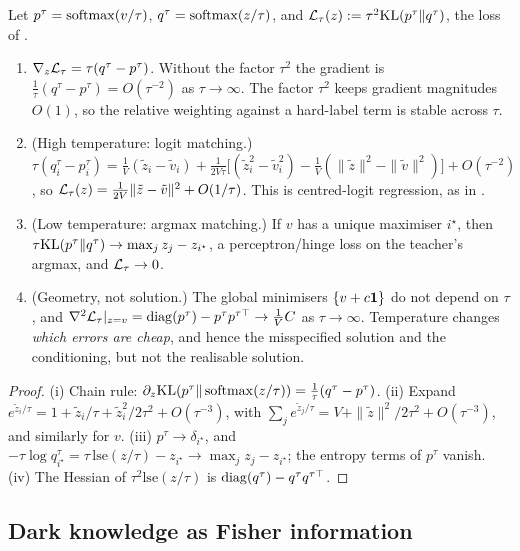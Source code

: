 Let $p^\tau=\operatorname{softmax}(v/\tau)$, $q^\tau=\operatorname{softmax}(z/\tau)$, and $\mathcal{L}_\tau(z):=\tau^2\mathrm{KL}(p^\tau\|q^\tau)$, the loss of
\citet{hinton2015distilling}.
\begin{proposition}\label{prop:temperature}
\Pv\Ck
\begin{enumerate}[label=(\roman*),nosep]
\item $\nabla_z\mathcal{L}_\tau=\tau(q^\tau-p^\tau)$. Without the factor $\tau^2$ the gradient is $\frac1\tau(q^\tau-p^\tau)=O(\tau^{-2})$
as $\tau\to\infty$. The factor $\tau^2$ keeps gradient magnitudes $O(1)$, so the relative weighting against a
hard-label term is stable across $\tau$.
\item (High temperature: logit matching.)
$\tau(q^\tau_i-p^\tau_i)=\frac1V(\tilde z_i-\tilde v_i)+\frac1{2V\tau}\big[(\tilde z_i^2-\tilde v_i^2)-\frac1V(\|\tilde z\|^2-\|\tilde v\|^2)\big]+O(\tau^{-2})$,
so $\mathcal{L}_\tau(z)=\frac1{2V}\|\tilde z-\tilde v\|^2+O(1/\tau)$. This is centred-logit regression, as in
\citet{ba2014do}.
\item (Low temperature: argmax matching.) If $v$ has a unique maximiser $i^\star$, then
$\tau\mathrm{KL}(p^\tau\|q^\tau)\to\max_jz_j-z_{i^\star}$, a perceptron/hinge loss on the teacher's argmax, and $\mathcal{L}_\tau\to0$.
\item (Geometry, not solution.) The global minimisers $\{v+c\mathbf{1}\}$ do not depend on $\tau$, and
$\nabla^2\mathcal{L}_\tau|_{z=v}=\operatorname{diag}(p^\tau)-p^\tau p^{\tau\top}\to\frac1VC$ as $\tau\to\infty$. Temperature changes \emph{which
errors are cheap}, and hence the misspecified solution and the conditioning, but not the realisable
solution.
\end{enumerate}
\end{proposition}
\begin{proof}
(i) Chain rule: $\partial_z\mathrm{KL}(p^\tau\|\operatorname{softmax}(z/\tau))=\frac1\tau(q^\tau-p^\tau)$.
(ii) Expand $e^{\tilde z_i/\tau}=1+\tilde z_i/\tau+\tilde z_i^2/2\tau^2+O(\tau^{-3})$, with
$\sum_je^{\tilde z_j/\tau}=V+\|\tilde z\|^2/2\tau^2+O(\tau^{-3})$, and similarly for $v$.
(iii) $p^\tau\to\delta_{i^\star}$, and $-\tau\log q^\tau_{i^\star}=\tau\,\mathrm{lse}(z/\tau)-z_{i^\star}\to\max_jz_j-z_{i^\star}$;
the entropy terms of $p^\tau$ vanish.
(iv) The Hessian of $\tau^2\mathrm{lse}(z/\tau)$ is $\operatorname{diag}(q^\tau)-q^\tau q^{\tau\top}$.
\end{proof}

\subsection{Dark knowledge as Fisher information}

